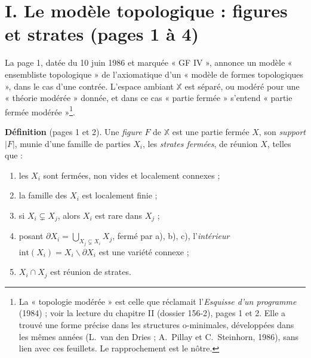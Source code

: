 \documentclass[11pt,a4paper]{article}
\begin{document}
\section*{I. Le modèle topologique : figures et strates (pages 1 à 4)}

La page 1, datée du 10 juin 1986 et marquée « GF IV », annonce un modèle
« ensembliste topologique » de l'axiomatique d'un « modèle de formes
topologiques », dans le cas d'une contrée. L'espace ambiant $\mathbb{X}$ est
séparé, ou modéré pour une « théorie modérée » donnée, et dans ce cas « partie
fermée » s'entend « partie fermée modérée »\footnote{La « topologie modérée »
est celle que réclamait l'\emph{Esquisse d'un programme} (1984) ; voir la
lecture du chapitre II (dossier 156-2), pages 1 et 2. Elle a trouvé une forme
précise dans les structures o-minimales, développées dans les mêmes années
(L.~van den Dries ; A.~Pillay et C.~Steinhorn, 1986), sans lien avec ces
feuillets. Le rapprochement est le nôtre.}.

\textbf{Définition} (pages 1 et 2). Une \emph{figure} $F$ de $\mathbb{X}$ est
une partie fermée $X$, son \emph{support} $|F|$, munie d'une famille de parties
$X_{i}$, les \emph{strates fermées}, de réunion $X$, telles que :
\begin{enumerate}
\item[a)] les $X_{i}$ sont fermées, non vides et localement connexes ;
\item[b)] la famille des $X_{i}$ est localement finie ;
\item[c)] si $X_{i} \subsetneq X_{j}$, alors $X_{i}$ est rare dans $X_{j}$ ;
\item[d)] posant $\partial X_{i} = \bigcup_{X_{j} \subsetneq X_{i}} X_{j}$,
fermé par a), b), c), l'\emph{intérieur} $\mathrm{int}(X_{i}) = X_{i}
\smallsetminus \partial X_{i}$ est une variété connexe ;
\item[f)] $X_{i} \cap X_{j}$ est réunion de strates.
\end{enumerate}
\end{document}
